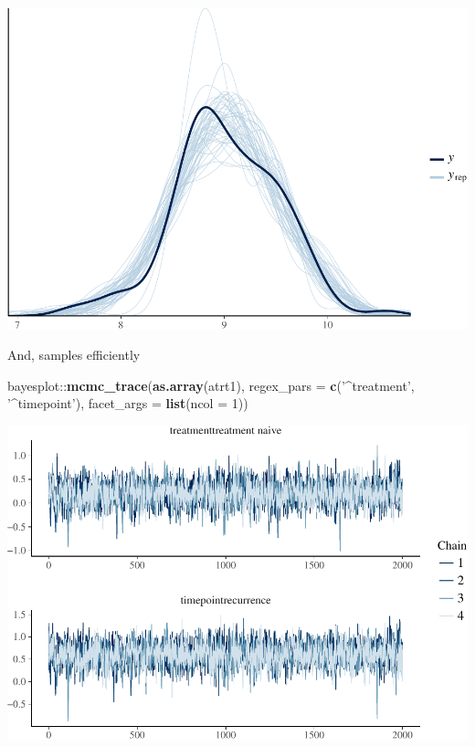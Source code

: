 \documentclass[]{article}
\newenvironment{Shaded}{\begin{snugshade}}{\end{snugshade}}
\newcommand{\KeywordTok}[1]{\textcolor[rgb]{0.13,0.29,0.53}{\textbf{{#1}}}}
\newcommand{\DataTypeTok}[1]{\textcolor[rgb]{0.13,0.29,0.53}{{#1}}}
\newcommand{\DecValTok}[1]{\textcolor[rgb]{0.00,0.00,0.81}{{#1}}}
\newcommand{\StringTok}[1]{\textcolor[rgb]{0.31,0.60,0.02}{{#1}}}
\newcommand{\NormalTok}[1]{{#1}}
\begin{document}
\includegraphics{Hierarchical_model_mutations_and_peptides_files/figure-latex/allsamp-atrt1-ppcheck-1.pdf}

And, samples efficiently

\begin{Shaded}
\begin{Highlighting}[]
\NormalTok{bayesplot::}\KeywordTok{mcmc_trace}\NormalTok{(}\KeywordTok{as.array}\NormalTok{(atrt1), }\DataTypeTok{regex_pars =} \KeywordTok{c}\NormalTok{(}\StringTok{'^treatment'}\NormalTok{, }\StringTok{'^timepoint'}\NormalTok{), }\DataTypeTok{facet_args =} \KeywordTok{list}\NormalTok{(}\DataTypeTok{ncol =} \DecValTok{1}\NormalTok{))}
\end{Highlighting}
\end{Shaded}

\includegraphics{Hierarchical_model_mutations_and_peptides_files/figure-latex/allsamp-atrt1-traceplot-1.pdf}
\end{document}
